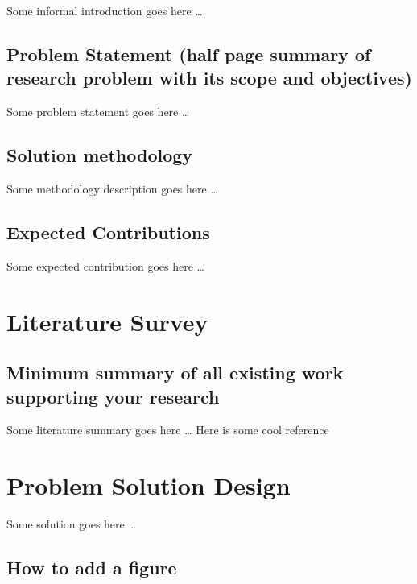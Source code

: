 \documentclass[]{article}
\begin{document}
Some informal introduction goes here \ldots{}

\subsection{Problem Statement (half page summary of research problem
with its scope and
objectives)}\label{problem-statement-half-page-summary-of-research-problem-with-its-scope-and-objectives}

Some problem statement goes here \ldots{}

\subsection{Solution methodology}\label{solution-methodology}

Some methodology description goes here \ldots{}

\subsection{Expected Contributions}\label{expected-contributions}

Some expected contribution goes here \ldots{}

\section{Literature Survey}\label{literature-survey}

\subsection{Minimum summary of all existing work supporting your
research}\label{minimum-summary-of-all-existing-work-supporting-your-research}

Some literature summary goes here \ldots{} Here is some cool reference
\citep{Goodfellow-et-al-2016}

\section{Problem Solution Design}\label{problem-solution-design}

Some solution goes here \ldots{}

\subsection{How to add a figure}\label{how-to-add-a-figure}
\end{document}
